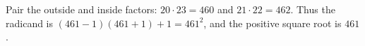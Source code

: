 Pair the outside and inside factors: $20\cdot23=460$ and $21\cdot22=462$. Thus the radicand is $(461-1)(461+1)+1=461^2$, and the positive square root is $\boxed{461}$.
